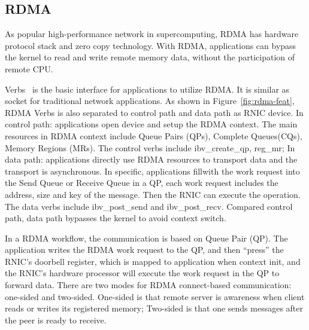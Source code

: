 \subsection{RDMA}
As popular high-performance network in supercomputing, RDMA has hardware protocol stack and zero copy technology. With RDMA, applications can bypass the kernel to read and write remote memory data, without the participation of remote CPU. 



Verbs~\cite{verbs} is the basic interface for applications to utilize RDMA. It is similar as socket for traditional network applications. As shown in Figure~\ref{fig:rdma-feat}, RDMA Verbs is also separated to control path and data path as RNIC device. In control path: applications open device and setup the RDMA context. The main resources in RDMA context include Queue Pairs (QPs), Complete Queues(CQs), Memory Regions (MRs). The control verbs include ibv\_create\_qp, reg\_mr;  In data path: applications directly use RDMA resources to transport data and the transport is asynchronous. In specific, applications fillwith the work request into the Send Queue or Receive Queue in a QP, each work request includes the address, size and key of the message. Then the RNIC can execute the operation. The data verbs include ibv\_post\_send and ibv\_post\_recv. Compared control path, data path bypasses the kernel to avoid context switch.

In a RDMA workflow, the communication is based on Queue Pair (QP). The application writes the RDMA work request to the QP, and then ``press''  the RNIC's doorbell register, which is mapped to application when context init, and the RNIC's hardware processor will execute the work request in the QP to forward data. There are two modes for RDMA connect-based communication: one-sided and two-sided. One-sided is that remote server is awareness when client reads or writes its registered memory; Two-sided is that one sends messages after the peer is ready to receive.

